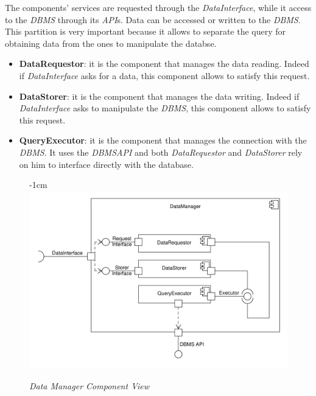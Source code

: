 \documentclass{article}
\begin{document}
				The components’ services are requested through the \emph{DataInterface}, while it access to the \emph{DBMS} through its \emph{API}s. Data can be accessed or written to the \emph{DBMS}. This partition is very important because it allows to separate the query for obtaining data from the ones to manipulate the databse.
				
				\begin{itemize}
					\item {\bfseries DataRequestor}: it is the component that manages the data reading. Indeed if \emph{DataInterface} asks for a data, this component allows to satisfy this request.
					
					\item {\bfseries DataStorer}: it is the component that manages the data writing. Indeed if \emph{DataInterface} asks to manipulate the \emph{DBMS}, this component allows to satisfy this request.
					
					\item {\bfseries QueryExecutor}: it is the component that manages the connection with the \emph{DBMS}. It uses the \emph{DBMSAPI} and both \emph{DataRequestor} and \emph{DataStorer} rely on him to interface directly with the database.
					
				\end{itemize}
			
				\begin{figure}
					\begin{adjustwidth} {-1cm}{}
						\centering
						\includegraphics[scale=0.5]{Component Diagrams/DataManagerComponentView.pdf}\\
					\end{adjustwidth}
					\caption{\emph{Data Manager Component View}}
				\end{figure}
			
\end{document}
